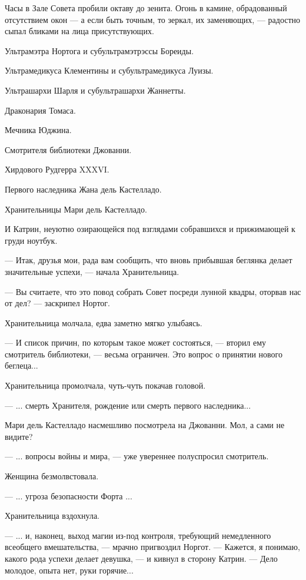 Часы в Зале Совета пробили октаву до зенита.
Огонь в камине, обрадованный отсутствием окон --- а если быть точным, то зеркал, их заменяющих, ---
радостно сыпал бликами на лица присутствующих.

Ультрамэтра Нортога и субультрамэтрэссы Бореиды.

Ультрамедикуса Клементины и субультрамедикуса Луизы.

Ультрашархи Шарля и субультрашархи Жаннетты.

Драконария Томаса.

Мечника Юджина.

Смотрителя библиотеки Джованни.

Хирдового Рудгерра XXXVI.


Первого наследника Жана дель Кастелладо.

Хранительницы Мари дель Кастелладо.


И Катрин, неуютно озирающейся под взглядами собравшихся и прижимающей к груди ноутбук.


--- Итак, друзья мои, рада вам сообщить, что вновь прибывшая беглянка делает значительные успехи, ---
начала Хранительница.

--- Вы считаете, что это повод собрать Совет посреди лунной квадры, оторвав нас от дел? --- заскрипел Нортог.

Хранительница молчала, едва заметно мягко улыбаясь.

--- И список причин, по которым такое может состояться, --- вторил ему смотритель библиотеки,
--- весьма ограничен. Это вопрос о принятии нового беглеца...

Хранительница промолчала, чуть-чуть покачав головой.

--- ... смерть Хранителя, рождение или смерть первого наследника...

Мари дель Кастелладо насмешливо посмотрела на Джованни. Мол, а сами не видите?

--- ... вопросы войны и мира, --- уже увереннее полуспросил смотритель.

Женщина безмолвстовала.

--- ... угроза безопасности Форта ...

Хранительница вздохнула.

--- ... и, наконец, выход магии из-под контроля, требующий немедленного всеобщего вмешательства, ---
мрачно пригвоздил Норгот. --- Кажется, я понимаю, какого рода успехи делает девушка, --- и кивнул в сторону Катрин.
--- Дело молодое, опыта нет, руки горячие...

